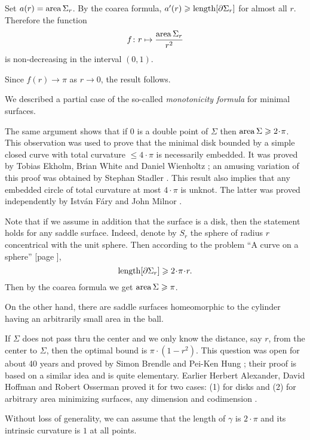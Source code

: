 Set $a(r)=\operatorname{\rm area}\nolimits\Sigma_r$.
By the coarea formula, $a'(r)\geqslant\operatorname{\rm length} [\partial\Sigma_r]$ for almost all $r$.
Therefore the function
\[f\colon r\mapsto \frac{\operatorname{\rm area}\nolimits\Sigma_r}{r^2}
\]
is non-decreasing in the interval $(0,1)$.

Since $f(r)\to \pi$ as $r\to0$, the result follows.\qeds

We described a partial case of the so-called \emph{monotonicity formula} for minimal surfaces.

The same argument shows that if $0$ is a double point
of $\Sigma$ then $\area\Sigma\z\ge 2\cdot \pi$.
This observation was used to prove 
that the minimal disk bounded by a simple closed curve with total curvature $\le 4\cdot\pi$ 
is necessarily embedded.
It was proved by 
Tobias Ekholm, 
Brian White 
and Daniel Wienholtz
\cite{EWW};
an amusing variation of this proof
was obtained by 
Stephan Stadler \cite{stadler-FM}.
This result also implies that any embedded circle of total curvature at most $4\cdot\pi$ is unknot.
The latter was proved independently by Istv{\'a}n F{\'a}ry \cite{fary-knot} and  John Milnor \cite{milnor}.

Note that if we assume in addition that the surface is a disk,
then the statement holds for any saddle surface. 
Indeed, denote by $S_r$ the sphere of radius $r$ concentrical with the unit sphere. 
Then according to the problem ``A curve on a sphere'' [page \pageref{A curve in a sphere}], 
\[\length[\partial\Sigma_r]\ge 2\cdot\pi\cdot r.\]
Then by the coarea formula we get $\operatorname{\rm area}\nolimits\Sigma\geqslant \pi$.

On the other hand, there are saddle surfaces homeomorphic to the cylinder
having an arbitrarily small area in the ball. 

If $\Sigma$ does not pass thru the center 
and we only know the distance, say $r$, 
from the center to $\Sigma$,
then the optimal bound is $\pi\cdot(1-r^2)$.
This question was open for about 40 years and proved by Simon Brendle and Pei-Ken Hung \cite{brende-hung};
their proof is based on a similar idea and is quite elementary.
Earlier Herbert Alexander, 
David Hoffman
and Robert Osserman 
proved it for two cases: (1) for disks and (2) for arbitrary area minimizing surfaces, any dimension and codimension
 \cite{alexander-osserman,alexander-hoffman-osserman}.






Without loss of generality, we can assume that the length of $\gamma$ is $2{\cdot}\pi$ and its intrinsic curvature is $1$ at all points.

